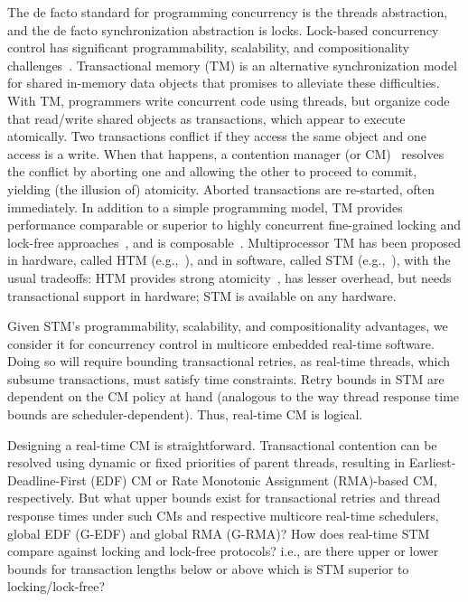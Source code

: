 \documentclass{sig-alternate}
\begin{document}
The de facto standard for programming concurrency is the threads abstraction, and the de facto synchronization abstraction is locks. 
Lock-based concurrency control has significant programmability, scalability, and compositionality challenges~\cite{Herlihy:2006:AMP:1146381.1146382}. Transactional memory (TM) is an alternative synchronization model for shared in-memory data objects that promises to alleviate these difficulties.  With TM, programmers write concurrent code using threads, but organize code that read/write shared objects as transactions, which appear to execute atomically. Two transactions conflict if they access the same object and one access is a write. When that happens, a contention manager (or CM)~\cite{Guerraoui:2005:TTT:1073814.1073863} resolves the conflict by aborting one and allowing the other to proceed to commit, yielding (the illusion of) atomicity. Aborted transactions are re-started, often immediately.  In addition to a simple programming model, TM provides performance comparable or superior to highly concurrent fine-grained locking and lock-free approaches~\cite{Saha:2006:MHP:1122971.1123001}, and is composable~\cite{Harris:2005:CMT:1065944.1065952}. Multiprocessor TM has been proposed in hardware, called HTM (e.g.,~\cite{austenmc:tcc:dissertation:2009}), and in software, called STM (e.g.,~\cite{sha95}), with the usual tradeoffs: HTM provides strong atomicity~\cite{austenmc:tcc:dissertation:2009}, has lesser overhead, but needs transactional support in hardware; STM is available on any hardware.


Given STM's programmability, scalability, and compositionality advantages, we consider it for concurrency control in multicore embedded real-time software. Doing so will require bounding transactional  retries, as real-time threads, which subsume transactions, must satisfy time constraints.  Retry bounds in STM are dependent on the CM policy at hand (analogous to the way thread response time bounds are scheduler-dependent). Thus, real-time CM is logical.

Designing a real-time CM is straightforward. Transactional contention can be resolved using dynamic or fixed priorities of parent threads, resulting in Earliest-Deadline-First (EDF) CM or Rate Monotonic Assignment (RMA)-based CM, respectively. But what upper bounds exist for transactional retries and thread response times under such CMs and respective multicore real-time schedulers, global EDF (G-EDF) and global RMA (G-RMA)? How does real-time STM compare against locking and lock-free protocols? i.e., are there upper or lower bounds for transaction lengths below or above which is STM superior to locking/lock-free?
\end{document}
